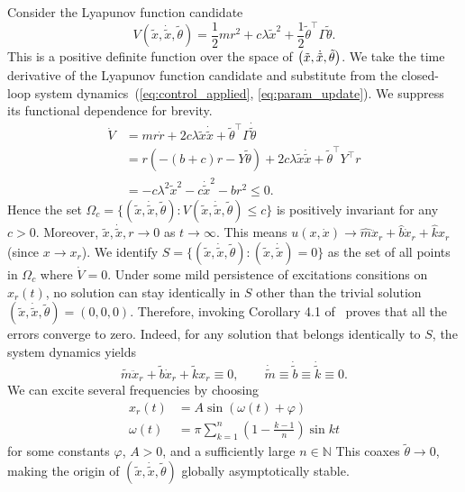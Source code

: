 Consider the Lyapunov function candidate
%
\begin{equation*}
    V(\tilde{x}, \dot{\tilde{x}}, \tilde{\theta}) = \frac{1}{2}mr^2 + 
    c\lambda\tilde{x}^2 + \frac{1}{2}\tilde{\theta}^\top\Gamma\tilde{\theta}.
\end{equation*}
%
This is a positive definite function over the space of $\begin{pmatrix}\tilde{x},
\dot{\tilde{x}}, \tilde{\theta}\end{pmatrix}$. We take the time derivative of the Lyapunov
function candidate and substitute from the closed-loop system
dynamics~(\ref{eq:control_applied}, \ref{eq:param_update}). We suppress its
functional dependence for brevity.
%
\begin{align*}
    \dot{V} &= mr\dot{r} + 2c\lambda \tilde{x}\dot{\tilde{x}} +
    \tilde{\theta}^\top\Gamma\dot{\tilde{\theta}} \\
            &= r\left(-(b+c)r - Y\tilde{\theta}\right) + 2c\lambda
            \tilde{x}\dot{\tilde{x}} + \tilde{\theta}^\top Y^\top r \\
            &= -c\lambda^2\tilde{x}^2 - c\dot{\tilde{x}}^2 - br^2 \leq 0.
\end{align*}
%
Hence the set $\Omega_c = \{(\tilde{x}, \dot{\tilde{x}}, \tilde{\theta}):
V(\tilde{x}, \dot{\tilde{x}}, \tilde{\theta}) \leq c \}$ is positively
invariant for any $c > 0$. Moreover, $\tilde{x}, \dot{\tilde{x}}, r \rightarrow
0$ as $t \rightarrow \infty$. This means $u(x, \dot{x}) \rightarrow
\hat{m}\ddot{x}_r + \hat{b}\dot{x}_r + \hat{k}x_r$ (since $x \rightarrow x_r$).
We identify $S = \{(\tilde{x}, \dot{\tilde{x}}, \tilde{\theta}): (\tilde{x},
\dot{\tilde{x}}) = 0\}$ as the set of all points in $\Omega_c$ where $\dot{V} =
0$. Under some mild persistence of excitations consitions on $x_r(t)$, no
solution can stay identically in $S$ other than the trivial solution
$(\tilde{x}, \dot{\tilde{x}}, \tilde{\theta}) = (0,0,0)$. Therefore, invoking
Corollary 4.1 of~\cite{khalil2015nonlinear} proves that all the errors converge
to zero.
%
Indeed, for any solution that belongs identically to $S$, the system
dynamics yields \[ \tilde{m}\ddot{x}_r + \tilde{b}\dot{x}_r + \tilde{k}x_r
\equiv 0, \qquad \dot{\tilde{m}} \equiv \dot{\tilde{b}} \equiv \dot{\tilde{k}}
\equiv 0. \] 
%
We can excite several frequencies by choosing 
\begin{align*}
    x_r(t) &= A\sin{\left(\omega(t) + \varphi\right)} \\
    \omega(t) &= \pi\sum_{k=1}^n \left(1-\frac{k-1}{n}\right)\sin{k t}
\end{align*}
%
for some constants $\varphi$, $A > 0$, and a sufficiently large $n \in
\mathbb{N}$ This coaxes $\tilde{\theta} \rightarrow 0$, making the origin of
$(\tilde{x}, \dot{\tilde{x}}, \tilde{\theta})$ globally asymptotically stable.
